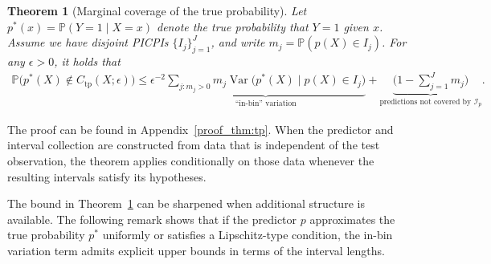 \documentclass[11pt]{article}
\theoremstyle{statplain}
\newtheorem{theorem}{Theorem}[section]
\theoremstyle{statdefinition}
\DeclareMathOperator{\Var}{Var}
\newcommand{\tp}{\mathrm{tp}}
\newcommand{\PP}{\mathbb{P}}
\newcommand{\0}{\mathbf{0}}
\newcommand{\I}{\mathcal{I}}
\newcommand{\interval}{I} %
\newcommand{\intervalset}{\I} %
\newcommand{\numInterval}{J} %
\newcommand{\titleShorts}{PICPIs\xspace}
\begin{document}

\begin{theorem}[Marginal coverage of the true probability]\label{thm:tp}
Let $p^*(x)=\PP(Y=1\mid X=x)$ denote the true probability that $Y=1$
given $x$. Assume we have disjoint \titleShorts
$\{\interval_j\}_{j=1}^{\numInterval}$, and write
$m_j=\PP(p(X)\in\interval_j)$. For any $\epsilon>0$, it holds that
\begin{align*}
  \PP\Big(p^*(X)\notin C_{\tp}(X;\epsilon)\Big) \leq\epsilon^{-2}
 \underbrace{\sum_{j:m_j>0}m_j
 \Var\Big(p^*(X)\mid p(X)\in\interval_j\Big)}_{\text{``in-bin'' variation}}
 +\underbrace{\Big(1-\sum_{j=1}^{\numInterval}m_j\Big)}_{
 \text{predictions not covered by }\intervalset_p}.
\end{align*}
\end{theorem}

The proof can be found in Appendix~\ref{proof_thm:tp}.
When the predictor and interval collection are constructed from data that is independent of the test observation, the theorem applies conditionally on those data whenever the resulting intervals satisfy its hypotheses.


The bound in Theorem~\ref{thm:tp} can be sharpened when additional structure is available. The following remark shows that if the predictor $p$ approximates the true probability $p^*$ uniformly or satisfies a Lipschitz-type condition, the in-bin variation term admits explicit upper bounds in terms of the interval lengths.
\end{document}
